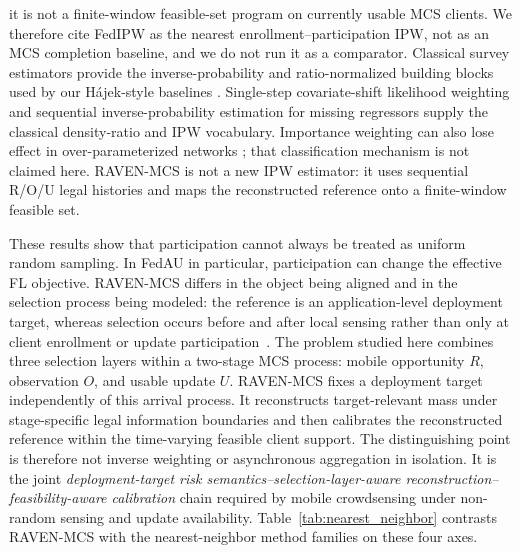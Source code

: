 \documentclass[letterpaper,journal]{IEEEtran}
\begin{document}
it is not a finite-window feasible-set program on currently usable MCS
clients.  We therefore cite FedIPW as the nearest enrollment--participation
IPW, not as an MCS completion baseline, and we do not run it as a comparator.
Classical survey estimators provide the inverse-probability and ratio-normalized
building blocks used by our H\'ajek-style baselines
\cite{horvitz1952generalization,hajek1971comment}.
Single-step covariate-shift likelihood weighting
\cite{shimodaira2000covariate} and sequential inverse-probability
estimation for missing regressors \cite{robins1994estimation} supply
the classical density-ratio and IPW vocabulary.
Importance weighting can also lose effect in over-parameterized
networks \cite{byrd2019importance}; that classification mechanism is
not claimed here.  RAVEN-MCS is not a
new IPW estimator: it uses sequential R/O/U legal histories and maps
the reconstructed reference onto a finite-window feasible set.

These results show that participation cannot always be treated as
uniform random sampling.  In FedAU in particular, participation can
change the effective FL objective.  RAVEN-MCS differs in the object
being aligned and in the selection process being modeled: the reference
is an application-level deployment target, whereas selection occurs
before and after local sensing rather than only at client enrollment or
update participation~\cite{morishita2026who}.  The problem studied here combines three selection
layers within a two-stage MCS process: mobile opportunity $R$,
observation $O$, and usable update $U$.  RAVEN-MCS fixes a deployment
target independently of this arrival process.  It reconstructs
target-relevant mass under stage-specific legal information boundaries
and then calibrates the reconstructed reference within the
time-varying feasible client support.  The distinguishing point is
therefore not inverse weighting or asynchronous aggregation in
isolation.  It is the joint \emph{deployment-target risk
semantics--selection-layer-aware reconstruction--feasibility-aware
calibration} chain required by mobile crowdsensing under non-random
sensing and update availability.  Table~\ref{tab:nearest_neighbor}
contrasts RAVEN-MCS with the nearest-neighbor method families on these
four axes.
\end{document}
